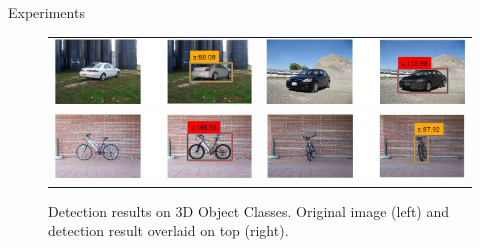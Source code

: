 \documentclass[serif,mathserif,final]{beamer}
\newcommand{\1}{\mathbb{I}} %
\begin{document}
\begin{frame}{}
\begin{columns}[t]
\begin{column}{0.23\linewidth}
      \begin{block}{Experiments}
        \begin{figure}
          \begin{center}
          \setlength\tabcolsep{0pt}
          \begin{tabular}{|c|c|}
            \hline
            \includegraphics[width=0.40\linewidth]{supp/car32.png} &
            \includegraphics[width=0.40\linewidth]{supp/car26.png} \\
            \includegraphics[width=0.40\linewidth]{supp/bicycle16.png} &
            \includegraphics[width=0.40\linewidth]{supp/bicycle12.png} \\
            \hline
          \end{tabular}
          \end{center}
          \caption{\small Detection results on 3D Object Classes. Original image
            (left) and detection result overlaid on top (right).}
          \label{fig:3dobject_vis}
        \end{figure}
        \vspace{-1.0em}
\begin{table}[t]
    \scriptsize
  \begin{center}

\end{center}
\end{table}
\end{block}
\end{column}
\end{columns}
\end{frame}
\end{document}

